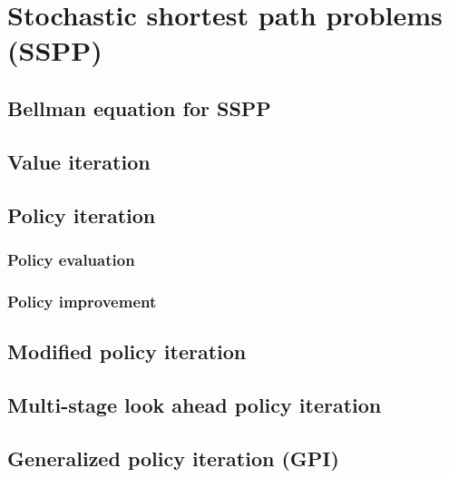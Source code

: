 \section{Stochastic shortest path problems (SSPP)}

\subsection{Bellman equation for SSPP}

\subsection{Value iteration}

\subsection{Policy iteration}

\subsubsection{Policy evaluation}

\subsubsection{Policy improvement}

\subsection{Modified policy iteration}

\subsection{Multi-stage look ahead policy iteration}

\subsection{Generalized policy iteration (GPI)}
